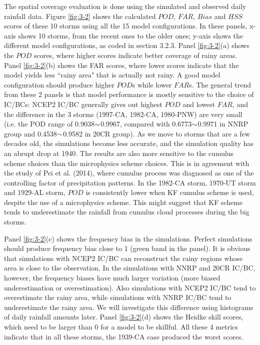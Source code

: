 The spatial coverage evaluation is done using the simulated and observed daily rainfall data. Figure \ref{fig:3-2} shows the calculated $POD$, $FAR$, $Bias$ and $HSS$ scores of these 10 storms using all the 15 model configurations. In these panels, x-axis shows 10 storms, from the recent ones to the older ones; y-axis shows the different model configurations, as coded in section 3.2.3. Panel \ref{fig:3-2}(a) shows the $POD$ scores, where higher scores indicate better coverage of rainy areas. Panel \ref{fig:3-2}(b) shows the FAR scores, where lower scores indicate that the model yields less ``rainy area" that is actually not rainy. A good model configuration should produce higher $POD$s while lower $FAR$s. The general trend from these 2 panels is that model performance is mostly sensitive to the choice of IC/BCs: NCEP2 IC/BC generally gives out highest $POD$ and lowest $FAR$, and the difference in the 3 storms (1997-CA, 1982-CA, 1980-PNW) are very small (i.e. the POD range of 0.9038$\scriptsize{\sim}$0.9967, compared with 0.6773$\scriptsize{\sim}$0.9971 in NNRP group and 0.4538$\scriptsize{\sim}$0.9582 in 20CR group). As we move to storms that are a few decades old, the simulations become less accurate, and the simulation quality has an abrupt drop at 1940. The results are also more sensitive to the cumulus scheme choices than the microphysics scheme choices. This is in agreement with the study of Pei et al. (2014), where cumulus process was diagnosed as one of the controlling factor of precipitation patterns. In the 1982-CA storm, 1970-UT storm and 1929-AL storm, $POD$ is consistently lower when KF cumulus scheme is used, despite the use of a microphysics scheme. This might suggest that KF scheme tends to underestimate the rainfall from cumulus cloud processes during the big storms.

Panel \ref{fig:3-2}(c) shows the frequency bias in the simulations. Perfect simulations should produce frequency bias close to 1 (green band in the panel). It is obvious that simulations with NCEP2 IC/BC can reconstruct the rainy regions whose area is close to the observation. In the simulations with NNRP and 20CR IC/BC, however, the frequency biases have much larger variation (more biased underestimation or overestimation). Also simulations with NCEP2 IC/BC tend to overestimate the rainy area, while simulations with NNRP IC/BC tend to underestimate the rainy area. We will investigate this difference using histograms of daily rainfall amounts later. Panel \ref{fig:3-2}(d) shows the Heidke skill scores, which need to be larger than 0 for a model to be skillful. All these 4 metrics indicate that in all these storms, the 1939-CA case produced the worst scores. 

